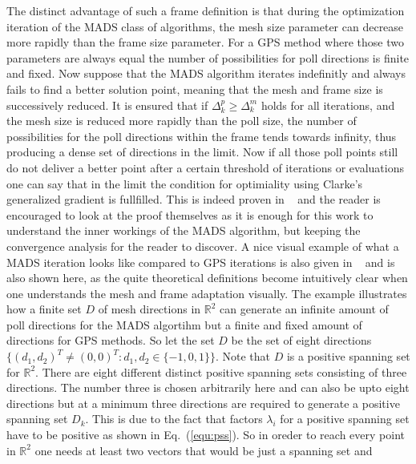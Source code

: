 \documentclass[a4paper,10pt]{article}
\newcommand{\equref}[1]{Eq.~(\ref{#1})}
\begin{document}
    The distinct advantage of such a frame definition is that during the 
    optimization iteration of the MADS class of algorithms, the mesh size
    parameter can decrease more rapidly than the frame size parameter.
    For a GPS method where those two parameters are always equal the number
    of possibilities for poll directions is finite and fixed.
    Now suppose that the MADS algorithm iterates indefinitly and always
    fails to find a better solution point, meaning that the mesh
    and frame size is successively reduced.
    It is ensured that if $\Delta^p_k \geq \Delta^m_k$ holds for all iterations,
    and the mesh size is reduced more rapidly than the poll size,
    the number of possibilities for the poll directions within the frame tends
    towards infinity, thus producing a dense set of directions in the limit.
    Now if all those poll points still do not deliver a better point
    after a certain threshold of iterations or evaluations one can say
    that in the limit the condition for optimiality using Clarke's
    generalized gradient is fullfilled.
    This is indeed proven in ~\cite{mads_original} and the reader is
    encouraged to look at the proof themselves as it is enough for this
    work to understand the inner workings of the MADS algorithm,
    but keeping the convergence analysis for the reader to discover.   
    A nice visual example of what a MADS iteration looks like compared
    to GPS iterations is also given in ~\cite{mads_original} and is
    also shown here, as the quite theoretical definitions become
    intuitively clear when one understands the mesh and frame adaptation
    visually.
    The example illustrates how a finite set $D$ of mesh directions in
    $\mathbb{R}^2$ can generate an infinite amount of poll directions
    for the MADS algortihm but a finite and fixed amount of directions
    for GPS methods.
    So let the set $D$ be the set of eight directions 
    $\{(d_1,d_2)^T \neq (0,0)^T : d_1,d_2 \in \{-1,0,1\}\}$.
    Note that $D$ is a positive spanning set for $\mathbb{R}^2$.
    There are eight different distinct positive spanning sets 
    consisting of three directions.
    The number three is chosen arbitrarily here and can also be
    upto eight directions but at a minimum three directions are 
    required to generate a positive spanning set $D_k$.
    This is due to the fact that factors $\lambda_i$ for a 
    positive spanning set have to be positive as shown in \equref{equ:pss}.
    So in oreder to reach every point in $\mathbb{R}^2$ one needs at
    least two vectors that would be just a spanning set and 
\end{document}
